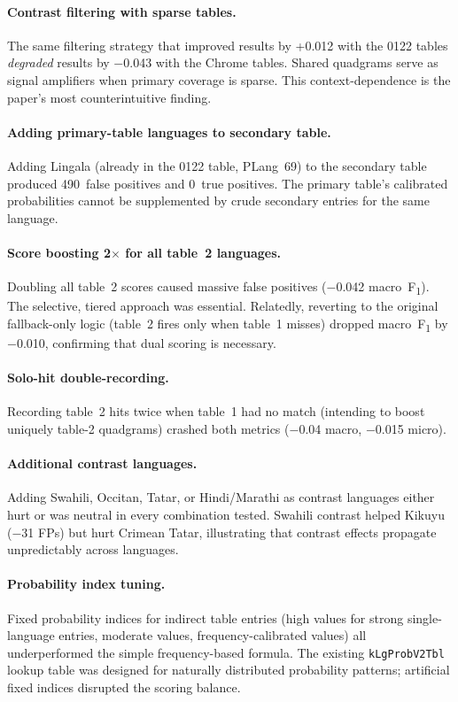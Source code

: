 \documentclass{article}
\newcommand{\fone}{F\textsubscript{1}}
\begin{document}
\paragraph{Contrast filtering with sparse tables.}
The same filtering strategy that improved results by +0.012 with the 0122 tables \emph{degraded} results by $-$0.043 with the Chrome tables.
Shared quadgrams serve as signal amplifiers when primary coverage is sparse.
This context-dependence is the paper's most counterintuitive finding.

\paragraph{Adding primary-table languages to secondary table.}
Adding Lingala (already in the 0122 table, PLang~69) to the secondary table produced 490~false positives and 0~true positives.
The primary table's calibrated probabilities cannot be supplemented by crude secondary entries for the same language.

\paragraph{Score boosting 2$\times$ for all table~2 languages.}
Doubling all table~2 scores caused massive false positives ($-$0.042 macro~\fone{}).
The selective, tiered approach was essential.
Relatedly, reverting to the original fallback-only logic (table~2 fires only when table~1 misses) dropped macro~\fone{} by $-$0.010, confirming that dual scoring is necessary.

\paragraph{Solo-hit double-recording.}
Recording table~2 hits twice when table~1 had no match (intending to boost uniquely table-2 quadgrams) crashed both metrics ($-$0.04 macro, $-$0.015 micro).

\paragraph{Additional contrast languages.}
Adding Swahili, Occitan, Tatar, or Hindi/Marathi as contrast languages either hurt or was neutral in every combination tested.
Swahili contrast helped Kikuyu ($-$31 FPs) but hurt Crimean Tatar, illustrating that contrast effects propagate unpredictably across languages.

\paragraph{Probability index tuning.}
Fixed probability indices for indirect table entries (high values for strong single-language entries, moderate values, frequency-calibrated values) all underperformed the simple frequency-based formula.
The existing \texttt{kLgProbV2Tbl} lookup table was designed for naturally distributed probability patterns; artificial fixed indices disrupted the scoring balance.
\end{document}
